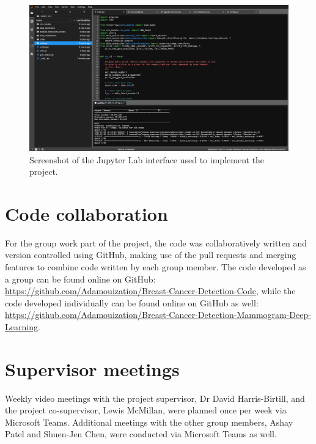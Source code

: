 \begin{figure}[ht]
\centerline{\includegraphics[width=\textwidth]{figures/appendix/jupyter_interface.png}}
\caption{\label{fig:appendix-jupyter_interface}Screenshot of the Jupyter Lab interface used to implement the project.}
\end{figure}

\section{Code collaboration}

For the group work part of the project, the code was collaboratively written and version controlled using GitHub, making use of the pull requests and merging features to combine code written by each group member. The code developed as a group can be found online on GitHub: \url{https://github.com/Adamouization/Breast-Cancer-Detection-Code}, while the code developed individually can be found online on GitHub as well: \url{https://github.com/Adamouization/Breast-Cancer-Detection-Mammogram-Deep-Learning}.

\section{Supervisor meetings}

Weekly video meetings with the project supervisor, Dr David Harris-Birtill, and the project co-supervisor, Lewis McMillan, were planned once per week via Microsoft Teams. Additional meetings with the other group members, Ashay Patel and Shuen-Jen Chen, were conducted via Microsoft Teams as well.
